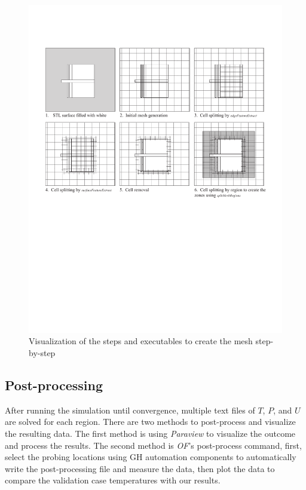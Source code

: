 \begin{figure}[htb]
     \centering
    \includegraphics[trim=1cm 11cm 1cm 3cm, clip, width=0.9\linewidth]{Figures/snappyhex.pdf}
     \caption[Mesh Creation Steps]{Visualization of the steps and executables to create the mesh step-by-step}
   \label{meshsteps}
 \end{figure}



\subsection{Post-processing}
After running the simulation until convergence, multiple text files of $T$, $P$, and $U$ are solved for each region. There are two methods to post-process and visualize the resulting data. The first method is using \textit{Paraview} to visualize the outcome and process the results. The second method is \textit{\gls{OF}}'s post-process command, first, select the probing locations using  \gls{GH} automation components to automatically write the post-processing file and measure the data, then plot the data to compare the validation case temperatures with our results. 




